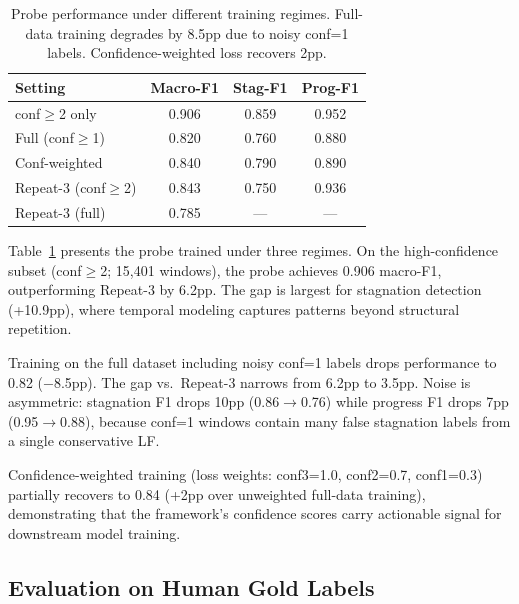 \documentclass[11pt]{article}
\begin{document}
\begin{table}[t]
\centering
\small
\begin{tabular}{lccc}
\toprule
\textbf{Setting} & \textbf{Macro-F1} & \textbf{Stag-F1} & \textbf{Prog-F1} \\
\midrule
conf$\geq$2 only & 0.906 & 0.859 & 0.952 \\
Full (conf$\geq$1) & 0.820 & 0.760 & 0.880 \\
Conf-weighted & 0.840 & 0.790 & 0.890 \\
\midrule
Repeat-3 (conf$\geq$2) & 0.843 & 0.750 & 0.936 \\
Repeat-3 (full) & 0.785 & --- & --- \\
\bottomrule
\end{tabular}
\caption{Probe performance under different training regimes. Full-data training degrades by 8.5pp due to noisy conf=1 labels. Confidence-weighted loss recovers 2pp.}
\label{tab:main}
\end{table}

Table~\ref{tab:main} presents the probe trained under three regimes. On the high-confidence subset (conf$\geq$2; 15,401 windows), the probe achieves 0.906 macro-F1, outperforming Repeat-3 by 6.2pp. The gap is largest for stagnation detection (+10.9pp), where temporal modeling captures patterns beyond structural repetition.

Training on the full dataset including noisy conf=1 labels drops performance to 0.82 ($-$8.5pp). The gap vs.\ Repeat-3 narrows from 6.2pp to 3.5pp. Noise is asymmetric: stagnation F1 drops 10pp (0.86$\to$0.76) while progress F1 drops 7pp (0.95$\to$0.88), because conf=1 windows contain many false stagnation labels from a single conservative LF.

Confidence-weighted training (loss weights: conf3=1.0, conf2=0.7, conf1=0.3) partially recovers to 0.84 (+2pp over unweighted full-data training), demonstrating that the framework's confidence scores carry actionable signal for downstream model training.

\subsection{Evaluation on Human Gold Labels}
\label{sec:gold}
\end{document}
